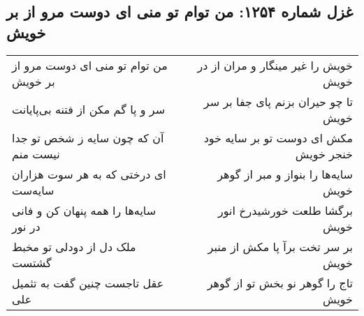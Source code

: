 \begin{center}
\section*{غزل شماره ۱۲۵۴: من توام تو منی ای دوست مرو از بر خویش}
\label{sec:1254}
\begin{longtable}{l p{0.5cm} r}
من توام تو منی ای دوست مرو از بر خویش
&&
خویش را غیر مینگار و مران از در خویش
\\
سر و پا گم مکن از فتنه بی‌پایانت
&&
تا چو حیران بزنم پای جفا بر سر خویش
\\
آن که چون سایه ز شخص تو جدا نیست منم
&&
مکش ای دوست تو بر سایه خود خنجر خویش
\\
ای درختی که به هر سوت هزاران سایه‌ست
&&
سایه‌ها را بنواز و مبر از گوهر خویش
\\
سایه‌ها را همه پنهان کن و فانی در نور
&&
برگشا طلعت خورشیدرخ انور خویش
\\
ملک دل از دودلی تو مخبط گشتست
&&
بر سر تخت برآ پا مکش از منبر خویش
\\
عقل تاجست چنین گفت به تثمیل علی
&&
تاج را گوهر نو بخش تو از گوهر خویش
\\
\end{longtable}
\end{center}
